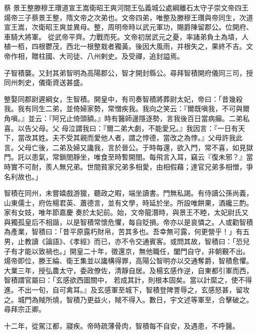 
\begin{pinyinscope}

 蔡
 景王整滕穆王瓚道宣王嵩衛昭王爽河間王弘義城公處綱離石太守子崇文帝四王煬帝三子蔡景王整，隋文帝之次弟也。文帝四弟，唯整及滕穆王瓚與帝同生，次道宣王嵩，次衛昭王爽並異母。整，周明帝時以武元軍功，賜爵陳留郡公。位開府、車騎大將軍。
 從武帝平齊。力戰而死。文帝初居武元之憂，率諸弟負土為墳，人植一栢，四根鬱茂，西北一根整栽者獨黃。後因大風雨，并根失之，果終不吉。文帝作相，贈柱國、大司徒、八州剌史。及受禪，追封謚焉。



 子智積襲。又封其弟智明為高陽郡公，智才開封縣公。尋拜智積開府儀同三司，授同州刺史，儀衛資送甚盛。



 整娶同郡尉遲綱女，生智積。開皇中，有司奏智積將葬尉太妃，帝曰：「昔幾殺我。我有同生二弟，並倚婦家勢，常憎疾我。我向之笑云：『爾既嗔我，不可與爾角嗔。』並云：『阿兄止倚頭額。』時有醫師邊隱逐勢，言我後百日當病癲。二弟私喜。以告父母。父
 母泣謂我曰：『爾二弟大劇，不能愛兄。』我因言：『一日有天下，當改其姓。夫不受其親而愛他人者，謂之悖德，當改之為悖。』父母許我此言。父母亡後，二弟及婦又讒我，言於晉公。于時每還，欲入門，常不喜，如見獄門。託以患氣，常鎖閤靜坐，唯食至時暫開閤。每飛言入耳，竊云『復未邪？』當時實不可耐，羨人無兄弟。世間貧家兄弟多相愛，由相假藉；達官兄弟多相憎，爭名利故也。」



 智積在同州，未嘗嬉戲游獵，聽政之暇，端坐讀書。門無私謁。有侍讀公孫尚義，山東儒士，府佐楊君英、蕭德言，並有文學，時延於坐。所設唯餅果，酒纔三酌。家有女妓，唯年節嘉慶
 奏於太妃前。始，文帝龍潛時，與景王不睦，太妃尉氏又與獨孤皇后不相諧，以是智積常懷危懼，每自貶損。帝亦以是哀憐之。人或勸智積為產業，智積曰：「昔平原露朽財帛，苦其多也。吾幸無可露，何更營乎！」有五男，止教讀《論語》、《孝經》而已，亦不令交通賓客。或問其故，智積曰：「恐兒子有才能以致禍也。」開皇二十年，徵還京，無他職任，闔門自守，非朝覲不出。煬帝即位，滕王綸、衛王集並以讒構得罪，高陽公智明亦以交通奪爵，智積愈懼。大業三年，授弘農太守，委政僚佐，清靜自居。及楊玄感作逆，自東都引軍而西，智積謂官屬曰：「玄感欲西圖關中，
 若成其計，則根本固矣。當以計縻之，使不得進。不出一旬，自可禽耳。』及玄感軍至城下，智積登陴詈辱之，玄感怒甚，留攻之。城門為賊所燒，智積乃更益火，賊不得入。數日，宇文述等軍至，合擊破之。尋拜宗正卿。



 十二年，從駕江都，寢疾。帝時疏薄骨肉，智積每不自安，及遇患，不呼醫。




\end{pinyinscope}
